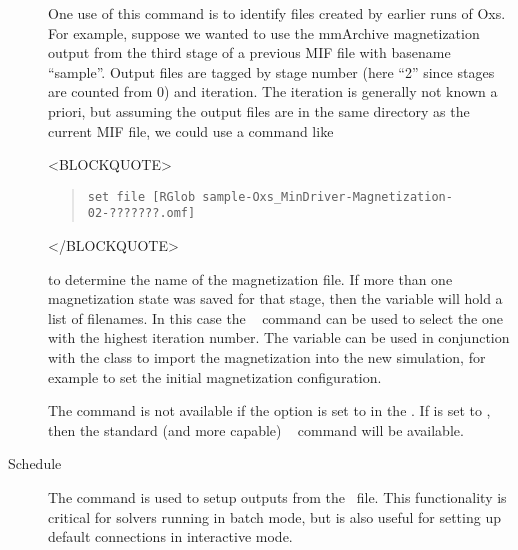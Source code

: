 \begin{description}
One use of this command is to identify files created by earlier runs of
Oxs.  For example, suppose we wanted to use the mmArchive magnetization
output from the third stage of a previous MIF file with basename ``sample''.
Output files are tagged by stage number (here ``2'' since stages are
counted from 0) and iteration.  The iteration is generally not known a
priori, but assuming the output files are in the same directory as the
current MIF file, we could use a command like
\begin{rawhtml}
<BLOCKQUOTE>
\end{rawhtml}
\begin{quote}
\begin{verbatim}
set file [RGlob sample-Oxs_MinDriver-Magnetization-02-???????.omf]
\end{verbatim}
\end{quote}
\begin{rawhtml}
</BLOCKQUOTE>
\end{rawhtml}
to determine the name of the magnetization file.  If more than one
magnetization state was saved for that stage, then the variable
 will hold a list of filenames.  In this case the \Tcl\ 
command can be used to select the one with the highest iteration number.
The  variable can be used in conjunction with the
class to import the magnetization into the new simulation, for example
to set the initial magnetization configuration.

The  command is not available if the 
option is set to  in the 
.  If  is set to
, then the standard (and more capable) \Tcl\
 command will be available.

\item[Schedule]
The \cd{Schedule} command is used to setup outputs from the \MIF\ file.
This functionality is critical for solvers running in batch mode, but is
also useful for setting up default connections in interactive mode.


\end{description}
